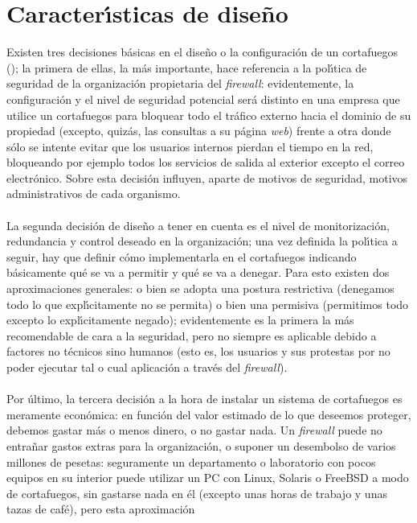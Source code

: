 \section{Caracter\'{\i}sticas de dise\~no}
Existen tres decisiones b\'asicas en el dise\~no o la configuraci\'on de un 
cortafuegos (\cite{kn:firefaq}); la primera de ellas, la m\'as importante, hace 
referencia a la pol\'{\i}tica de seguridad de la organizaci\'on propietaria del 
{\it firewall}: evidentemente, la configuraci\'on y el nivel de seguridad 
potencial ser\'a distinto en una empresa que utilice un cortafuegos para 
bloquear todo el tr\'afico externo hacia el dominio de su propiedad (excepto, 
quiz\'as, las consultas a su p\'agina
{\it web}) frente a otra donde s\'olo se intente evitar que los usuarios 
internos pierdan el tiempo en la red, bloqueando por ejemplo todos los servicios
de salida al exterior excepto el correo electr\'onico. Sobre esta decisi\'on
influyen, aparte de motivos de seguridad, motivos administrativos de cada
organismo.\\
\\La segunda decisi\'on de dise\~no a tener en cuenta es el nivel de 
monitorizaci\'on, redundancia y control deseado en la organizaci\'on; una vez
definida la pol\'{\i}tica a seguir, hay que definir c\'omo implementarla en el
cortafuegos indicando b\'asicamente qu\'e se va a permitir y qu\'e se va a 
denegar. Para esto existen dos aproximaciones generales: o bien se adopta una
postura restrictiva (denegamos todo lo que expl\'{\i}citamente no se permita) o
bien una permisiva (permitimos todo excepto lo expl\'{\i}citamente negado);
evidentemente es la primera la m\'as recomendable de cara a la seguridad, pero
no siempre es aplicable debido a factores no t\'ecnicos sino humanos (esto
es, los usuarios y sus protestas por no poder ejecutar tal o cual aplicaci\'on
a trav\'es del {\it firewall}).\\
\\Por \'ultimo, la tercera decisi\'on a la hora de instalar un sistema de 
cortafuegos es
meramente econ\'omica: en funci\'on del valor estimado de lo que deseemos 
proteger, debemos gastar m\'as o menos dinero, o no gastar nada. Un {\it 
firewall} puede no entra\~nar gastos extras para la organizaci\'on, o suponer
un desembolso de varios millones de pesetas: seguramente un departamento o 
laboratorio con pocos equipos en su interior puede utilizar un PC con Linux,
Solaris o FreeBSD a modo de cortafuegos, sin gastarse nada en \'el (excepto
unas horas de trabajo y unas tazas de caf\'e), pero esta aproximaci\'on 
